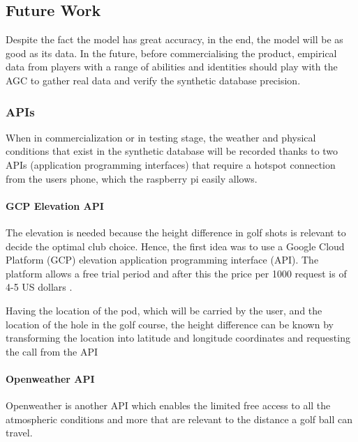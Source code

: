 \documentclass[11pt,landscape]{article}
\begin{document}
\begin{multicols}{3}
\subsection{Future Work}
Despite the fact the model has great accuracy, in the end, the model will be as
good as its data. In the future, before commercialising the product, empirical
data from players with a range of abilities and identities should play with the
AGC to gather real data and verify the synthetic database precision.

\subsubsection{APIs}
When in commercialization or in testing stage, the weather and physical
conditions that exist in the synthetic database will be recorded thanks to two
APIs (application programming interfaces) that require a hotspot connection from
the users phone, which the raspberry pi easily allows.

\paragraph{GCP Elevation API} 
The elevation is needed because the height difference in golf shots is relevant
to decide the optimal club choice. Hence, the first idea was to use a Google
Cloud Platform (GCP) elevation application programming interface (API). The
platform allows a free trial period and after this the price per 1000 request is
of 4-5 US dollars \cite{google_docs}. 

Having the location of the pod, which will be carried by the user, and the
location of the hole in the golf course, the height difference can be known by
transforming the location into latitude and longitude coordinates and requesting
the call from the API

\paragraph{Openweather API}
Openweather is another API which enables the limited free access to all the
atmospheric conditions and more that are relevant to the distance a golf ball
can travel.

\end{multicols}
\end{document}
